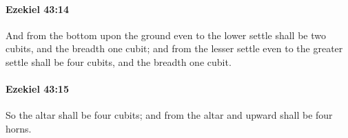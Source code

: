		\paragraph{Ezekiel 43:14} %
			\label{EZEKIEL-43-14}

			And from the bottom upon the ground even to the lower settle shall be two cubits, and the breadth one cubit; and from the lesser settle even to the greater settle shall be four cubits, and the breadth one cubit.


		\paragraph{Ezekiel 43:15} %
			\label{EZEKIEL-43-15}

			So the altar shall be four cubits; and from the altar and upward shall be four horns.


